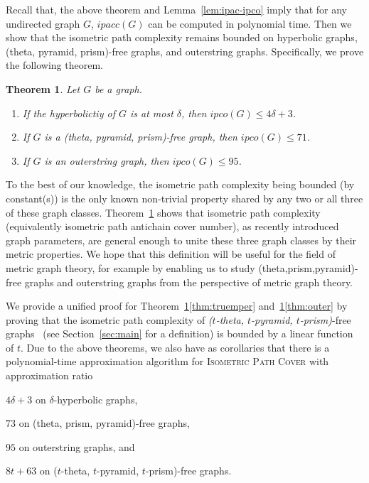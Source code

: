 \documentclass[a4paper]{article}
\newcommand{\IPC}{\textsc{Isometric Path Cover}\xspace}
\newcommand{\ipac}[1]{ipacc\left(#1\right)}
\newcommand{\ipco}[1]{ipco\left(#1\right)}
\newtheorem{theorem}{Theorem}
\begin{document}
Recall that, the above theorem and Lemma~\ref{lem:ipac-ipco} imply that for any undirected graph $G$, $\ipac{G}$ can be computed in polynomial time. Then we show that the isometric path complexity remains bounded on hyperbolic graphs, (theta, pyramid, prism)-free graphs, and outerstring graphs. Specifically, we prove the following theorem.

\begin{theorem}\label{thm:main}
Let $G$ be a graph.
\vspace{-5pt}
    \begin{enumerate}[label=(\alph*)]
        \item \label{thm:hyperbolicity} If the hyperbolictiy of $G$ is at most $\delta$, then $\ipco{G} \leq  4\delta+3$.
        \item\label{thm:truemper} If $G$ is a (theta, pyramid, prism)-free graph, then $\ipco{G} \leq 71$.
        \item\label{thm:outer} If $G$ is an outerstring graph, then $\ipco{G} \leq 95$.
    \end{enumerate}
\end{theorem}

To the best of our knowledge, the isometric path complexity being bounded (by constant(s)) is the only known non-trivial property shared by any two or all three of these graph classes. Theorem~\ref{thm:main} shows that isometric path complexity (equivalently isometric path antichain cover number), as recently introduced graph parameters, are general enough to unite these three graph classes by their metric properties. We hope that this definition will be useful for the field of metric graph theory, for example by enabling us to study (theta,prism,pyramid)-free graphs and outerstring graphs from the perspective of metric graph theory. 

We provide a unified proof for Theorem~\ref{thm:main}\ref{thm:truemper} and~\ref{thm:main}\ref{thm:outer} by proving that the isometric path complexity of \emph{($t$-theta, $t$-pyramid, $t$-prism)}-free graphs~\cite{trotignonprivate} (see Section~\ref{sec:main} for a definition) is bounded by a linear function of $t$. Due to the above theorems, we also have as corollaries that there is a {polynomial-time} approximation algorithm for \IPC with approximation ratio
\begin{enumerate*}[label=(\alph*)]
    \item $4\delta+3$ on $\delta$-hyperbolic graphs,
    \item $73$ on (theta, prism, pyramid)-free graphs,
    \item $95$ on outerstring graphs, and
    \item $8t+63$ on ($t$-theta, $t$-pyramid, $t$-prism)-free graphs.
\end{enumerate*}
\end{document}
